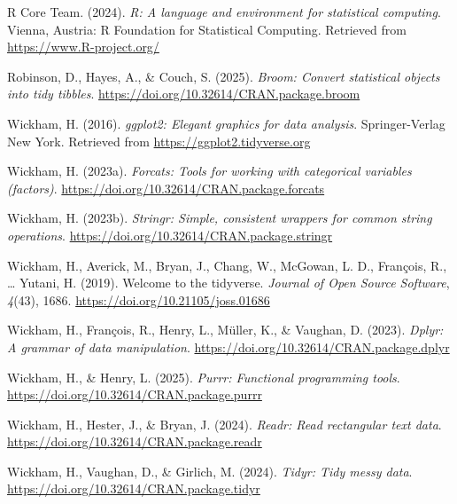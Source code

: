 \documentclass[
  ,man,floatsintext]{apa6}
\newlength{\cslhangindent}
\newenvironment{CSLReferences}[2] %
 {\begin{list}{}{%
  \setlength{\itemindent}{0pt}
  \setlength{\leftmargin}{0pt}
  \setlength{\parsep}{0pt}
  \ifodd #1
   \setlength{\leftmargin}{\cslhangindent}
   \setlength{\itemindent}{-1\cslhangindent}
  \fi
  \setlength{\itemsep}{#2\baselineskip}}}
 {\end{list}}
\begin{document}
\begin{CSLReferences}{1}{0}
R Core Team. (2024). \emph{R: A language and environment for statistical computing}. Vienna, Austria: R Foundation for Statistical Computing. Retrieved from \url{https://www.R-project.org/}

Robinson, D., Hayes, A., \& Couch, S. (2025). \emph{Broom: Convert statistical objects into tidy tibbles}. \url{https://doi.org/10.32614/CRAN.package.broom}

Wickham, H. (2016). \emph{ggplot2: Elegant graphics for data analysis}. Springer-Verlag New York. Retrieved from \url{https://ggplot2.tidyverse.org}

Wickham, H. (2023a). \emph{Forcats: Tools for working with categorical variables (factors)}. \url{https://doi.org/10.32614/CRAN.package.forcats}

Wickham, H. (2023b). \emph{Stringr: Simple, consistent wrappers for common string operations}. \url{https://doi.org/10.32614/CRAN.package.stringr}

Wickham, H., Averick, M., Bryan, J., Chang, W., McGowan, L. D., François, R., \ldots{} Yutani, H. (2019). Welcome to the {tidyverse}. \emph{Journal of Open Source Software}, \emph{4}(43), 1686. \url{https://doi.org/10.21105/joss.01686}

Wickham, H., François, R., Henry, L., Müller, K., \& Vaughan, D. (2023). \emph{Dplyr: A grammar of data manipulation}. \url{https://doi.org/10.32614/CRAN.package.dplyr}

Wickham, H., \& Henry, L. (2025). \emph{Purrr: Functional programming tools}. \url{https://doi.org/10.32614/CRAN.package.purrr}

Wickham, H., Hester, J., \& Bryan, J. (2024). \emph{Readr: Read rectangular text data}. \url{https://doi.org/10.32614/CRAN.package.readr}

Wickham, H., Vaughan, D., \& Girlich, M. (2024). \emph{Tidyr: Tidy messy data}. \url{https://doi.org/10.32614/CRAN.package.tidyr}

\end{CSLReferences}


\clearpage
\renewcommand{\listfigurename}{Figure captions}

\clearpage
\renewcommand{\listtablename}{Table captions}
\end{document}
